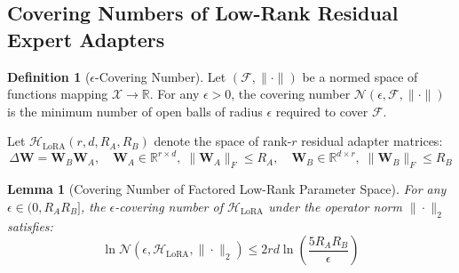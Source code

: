 \documentclass{article}
\newtheorem{lemma}[theorem]{Lemma}
\theoremstyle{definition}
\newtheorem{definition}{Definition}
\begin{document}
\subsection{Covering Numbers of Low-Rank Residual Expert Adapters}
\begin{definition}[$\epsilon$-Covering Number]
Let $(\mathcal{F}, \|\cdot\|)$ be a normed space of functions mapping $\mathcal{X} \to \mathbb{R}$. For any $\epsilon > 0$, the covering number $\mathcal{N}(\epsilon, \mathcal{F}, \|\cdot\|)$ is the minimum number of open balls of radius $\epsilon$ required to cover $\mathcal{F}$.
\end{definition}

Let $\mathcal{H}_{\text{LoRA}}(r, d, R_A, R_B)$ denote the space of rank-$r$ residual adapter matrices:
\begin{equation}
\Delta \mathbf{W} = \mathbf{W}_B \mathbf{W}_A, \quad \mathbf{W}_A \in \mathbb{R}^{r \times d}, \; \|\mathbf{W}_A\|_F \le R_A, \quad \mathbf{W}_B \in \mathbb{R}^{d \times r}, \; \|\mathbf{W}_B\|_F \le R_B
\end{equation}

\begin{lemma}[Covering Number of Factored Low-Rank Parameter Space]
\label{lem:covering_lora}
For any $\epsilon \in (0, R_A R_B]$, the $\epsilon$-covering number of $\mathcal{H}_{\text{LoRA}}$ under the operator norm $\|\cdot\|_2$ satisfies:
\begin{equation}
\ln \mathcal{N}\left(\epsilon, \mathcal{H}_{\text{LoRA}}, \|\cdot\|_2\right) \le 2 r d \ln\left( \frac{5 R_A R_B}{\epsilon} \right)
\end{equation}
\end{lemma}
\end{document}

